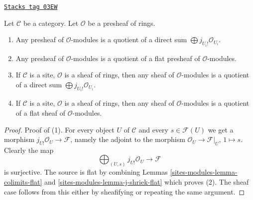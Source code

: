 \begin{lemma}
\label{sites-modules-lemma-module-quotient-flat}
\href{https://stacks.math.columbia.edu/tag/03EW}{\texttt{Stacks tag 03EW}}

Let $\mathcal{C}$ be a category.
Let $\mathcal{O}$ be a presheaf of rings.
\begin{enumerate}
\item Any presheaf of $\mathcal{O}$-modules is a quotient of
a direct sum $\bigoplus j_{U_i!}\mathcal{O}_{U_i}$.
\item Any presheaf of $\mathcal{O}$-modules is a quotient of
a flat presheaf of $\mathcal{O}$-modules.
\item If $\mathcal{C}$ is a site, $\mathcal{O}$ is a sheaf of rings,
then any sheaf of $\mathcal{O}$-modules is a quotient of
a direct sum $\bigoplus j_{U_i!}\mathcal{O}_{U_i}$.
\item If $\mathcal{C}$ is a site, $\mathcal{O}$ is a sheaf of rings,
then any sheaf of $\mathcal{O}$-modules is a quotient of
a flat sheaf of $\mathcal{O}$-modules.
\end{enumerate}
\end{lemma}

\begin{proof}
Proof of (1). For every object $U$ of $\mathcal{C}$ and every
$s \in \mathcal{F}(U)$ we get a morphism
$j_{U!}\mathcal{O}_U \to \mathcal{F}$, namely the adjoint to
the morphism $\mathcal{O}_U \to \mathcal{F}|_U$, $1 \mapsto s$.
Clearly the map
$$
\bigoplus\nolimits_{(U, s)} j_{U!}\mathcal{O}_U
\longrightarrow
\mathcal{F}
$$
is surjective. The source is flat by combining Lemmas
\ref{sites-modules-lemma-colimits-flat} and \ref{sites-modules-lemma-j-shriek-flat}
which proves (2). The sheaf case follows from this either by
sheafifying or repeating the same argument.
\end{proof}

